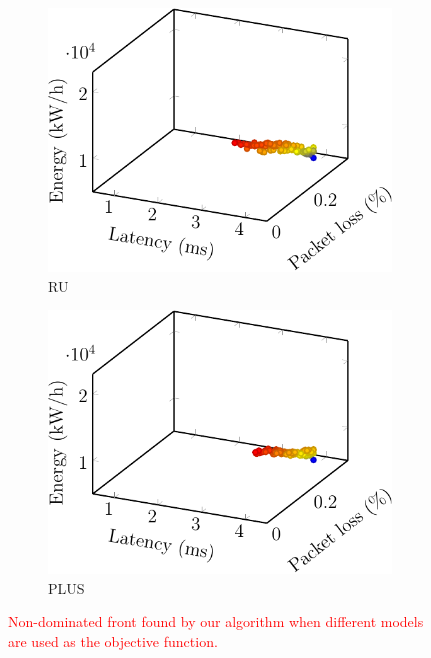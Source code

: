 \begin{figure}[t!]
    \begin{subfigure}[b]{0.48\linewidth}
        \includegraphics[width=\textwidth]{graphs/model/resources_energy-crop}
        \caption{RU}
    \end{subfigure}
    \begin{subfigure}[b]{0.48\linewidth}
        \includegraphics[width=\textwidth]{graphs/model/length_used-crop}
        \caption{PLUS}
    \end{subfigure}
    \vspace{1em}
    \caption{\textcolor{red}{Non-dominated front found by our algorithm when different models are used as the objective function.}}
    \label{fig:model_objectives}
\end{figure}

